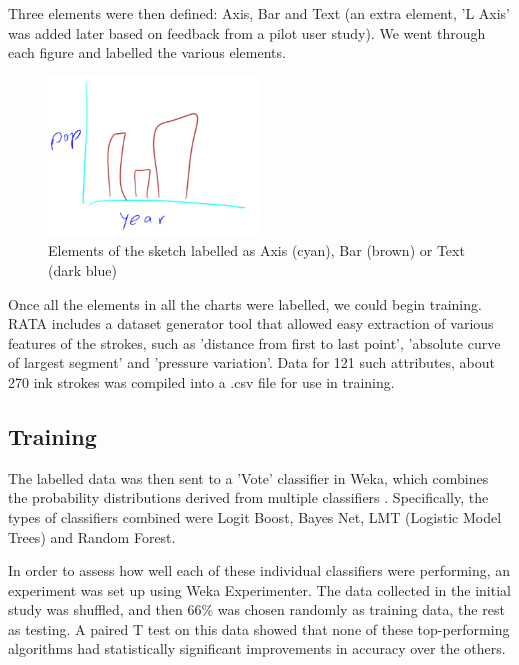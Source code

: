 	Three elements were then defined: Axis, Bar and Text (an extra element, 'L Axis' was added later based on feedback from a pilot user study). We went through each figure and labelled the various elements.
	
	\begin{figure}[H]
		\centering
		\includegraphics[width=0.5\textwidth]{collection_labelled}
		\caption{Elements of the sketch labelled as Axis (cyan), Bar (brown) or Text (dark blue)}
		\label{fig:collection_labelled}
	\end{figure}

	Once all the elements in all the charts were labelled, we could begin training. RATA includes a dataset generator tool that allowed easy extraction of various features of the strokes, such as 'distance from first to last point', 'absolute curve of largest segment' and 'pressure variation'. Data for 121 such attributes, about 270 ink strokes was compiled into a .csv file for use in training. 
	
	\subsection{Training}	
	The labelled data was then sent to a 'Vote' classifier in Weka, which combines the probability distributions derived from multiple classifiers \citep{kuncheva_combining_2004}. Specifically, the types of classifiers combined were Logit Boost, Bayes Net, LMT (Logistic Model Trees) and Random Forest. 
	
	In order to assess how well each of these individual classifiers were performing, an experiment was set up using Weka Experimenter. The data collected in the initial study was shuffled, and then 66\% was chosen randomly as training data, the rest as testing. A paired T test on this data showed that none of these top-performing algorithms had statistically significant improvements in accuracy over the others.
	

